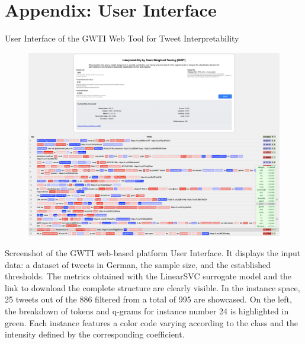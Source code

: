\documentclass[runningheads,10pt]{llncs}
\begin{document}
\newpage

\section{Appendix: User Interface}
\label{ap:user_interface}

User Interface of the \ac{GWTI} Web Tool for Tweet Interpretability

\begin{figure}[htbp]
  \hspace*{-1.7cm}
  \includegraphics[width=1.2\textwidth]{big_screen.png}
  \label{fig:user_interface}
\end{figure}
  
\vspace*{-0.7cm}

Screenshot of the \ac{GWTI} web-based platform User Interface. It displays the input data: a dataset of tweets in German, the sample size, and the established thresholds. The metrics obtained with the LinearSVC surrogate model and the link to download the complete structure are clearly visible. In the instance space, 25 tweets out of the 886 filtered from a total of 995 are showcased. On the left, the breakdown of tokens and q-grams for instance number 24 is highlighted in green. Each instance features a color code varying according to the class and the intensity defined by the corresponding coefficient.
\end{document}
